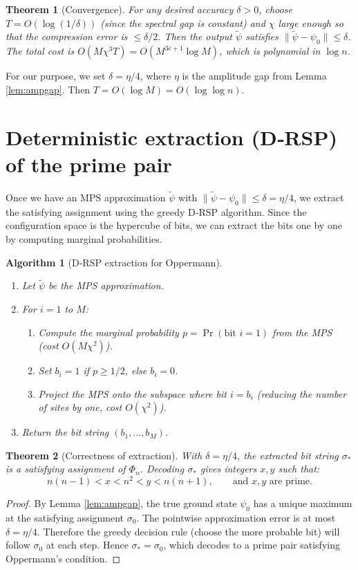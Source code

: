 \documentclass[11pt,a4paper]{article}
\newtheorem{theorem}{Theorem}[section]
\newtheorem{algorithm}{Algorithm}[section]
\begin{document}
\begin{theorem}[Convergence]\label{thm:power}
For any desired accuracy \(\delta > 0\), choose \(T = O(\log(1/\delta))\) (since the spectral gap is constant) and \(\chi\) large enough so that the compression error is \(\le \delta/2\). Then the output \(\tilde{\psi}\) satisfies \(\|\tilde{\psi} - \psi_0\| \le \delta\). The total cost is \(O(M\chi^3 T) = O(M^{3c+1} \log M)\), which is polynomial in \(\log n\).
\end{theorem}

For our purpose, we set \(\delta = \eta/4\), where \(\eta\) is the amplitude gap from Lemma \ref{lem:ampgap}. Then \(T = O(\log M) = O(\log \log n)\).

\section{Deterministic extraction (D‑RSP) of the prime pair}

Once we have an MPS approximation \(\tilde{\psi}\) with \(\|\tilde{\psi} - \psi_0\| \le \delta = \eta/4\), we extract the satisfying assignment using the greedy D‑RSP algorithm. Since the configuration space is the hypercube of bits, we can extract the bits one by one by computing marginal probabilities.

\begin{algorithm}[D‑RSP extraction for Oppermann]\label{alg:drsp}
\begin{enumerate}
\item Let \(\tilde{\psi}\) be the MPS approximation.
\item For \(i = 1\) to \(M\):
   \begin{enumerate}
   \item Compute the marginal probability \(p = \Pr(\text{bit } i = 1)\) from the MPS (cost \(O(M\chi^2)\)).
   \item Set \(b_i = 1\) if \(p \ge 1/2\), else \(b_i = 0\).
   \item Project the MPS onto the subspace where bit \(i = b_i\) (reducing the number of sites by one, cost \(O(\chi^2)\)).
   \end{enumerate}
\item Return the bit string \((b_1,\dots,b_M)\).
\end{enumerate}
\end{algorithm}

\begin{theorem}[Correctness of extraction]\label{thm:drsp}
With \(\delta = \eta/4\), the extracted bit string \(\sigma_*\) is a satisfying assignment of \(\Phi_n\). Decoding \(\sigma_*\) gives integers \(x,y\) such that:
\[
n(n-1) < x < n^2 < y < n(n+1),\qquad \text{and } x,y \text{ are prime}.
\]
\end{theorem}
\begin{proof}
By Lemma \ref{lem:ampgap}, the true ground state \(\psi_0\) has a unique maximum at the satisfying assignment \(\sigma_0\). The pointwise approximation error is at most \(\delta = \eta/4\). Therefore the greedy decision rule (choose the more probable bit) will follow \(\sigma_0\) at each step. Hence \(\sigma_* = \sigma_0\), which decodes to a prime pair satisfying Oppermann's condition.
\end{proof}
\end{document}
